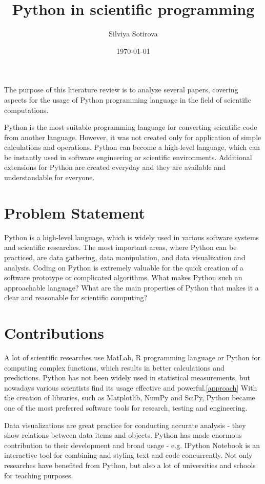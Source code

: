 \documentclass{article}
\title{Python in scientific programming}
\author{Silviya Sotirova}
\date{\today}
\begin{document}
\maketitle

%
%
\abstract{}
The purpose of this literature review is to analyze several papers, covering aspects for the usage of Python programming language in the field of scientific computations. 

Python is the most suitable programming language for converting scientific code from another language. However, it was not created only for application of simple calculations and operations. Python can become a high-level language, which can be instantly used in software engineering or scientific environments. Additional extensions for Python are created everyday and they are available and understandable for everyone.

\section{Problem Statement}

Python is a high-level language, which is widely used in various software systems and scientific researches. The most important areas, where Python can be practiced, are data gathering, data manipulation, and data visualization and analysis. Coding on Python is extremely valuable for the quick creation of a software prototype or complicated algorithms. What makes Python such an approachable language? What are the main properties of Python that makes it a clear and reasonable for scientific computing? 


\section{Contributions}
A lot of scientific researches use MatLab, R programming language or Python for computing complex functions, which results in better calculations and predictions. Python has not been widely used in statistical measurements, but nowadays various scientists find its usage effective and powerful.\ref{approach} With the creation of libraries, such as Matplotlib, NumPy and SciPy, Python became one of the most preferred software tools for research, testing and engineering. 

Data visualizations are great practice for conducting accurate analysis - they show relations between data items and objects. Python has made enormous contribution to their development and broad usage - e.g. IPython Notebook is an interactive tool for combining and styling text and code concurrently. Not only researches have benefited from Python, but also a lot of universities and schools for teaching purposes.
\end{document}
